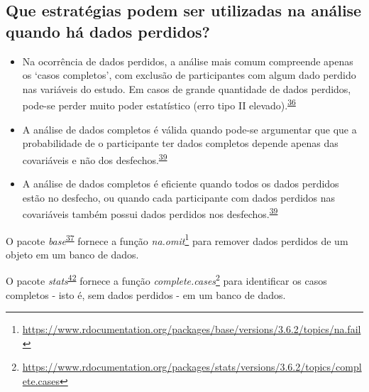 \documentclass[
  a4paper,
]{book}
\renewcommand{\href}[2]{#2\footnote{\url{#1}}}
\newenvironment{infobox}[1]
  {
  \begin{itemize}
  \renewcommand{\labelitemi}{
    \raisebox{-.7\height}[0pt][0pt]{
      {\setkeys{Gin}{width=3em,keepaspectratio}
        \texttt{[image: \#1]}}
    }
  }
  \setlength{\fboxsep}{1em}
  \begin{blackbox}
  \item
  }
  {
  \end{blackbox}
  \end{itemize}
  }
\begin{document}
\hypertarget{que-estratuxe9gias-podem-ser-utilizadas-na-anuxe1lise-quando-huxe1-dados-perdidos}{%
\subsection{Que estratégias podem ser utilizadas na análise quando há dados perdidos?}\label{que-estratuxe9gias-podem-ser-utilizadas-na-anuxe1lise-quando-huxe1-dados-perdidos}}

\begin{itemize}
\item
  Na ocorrência de dados perdidos, a análise mais comum compreende apenas os `casos completos', com exclusão de participantes com algum dado perdido nas variáveis do estudo. Em casos de grande quantidade de dados perdidos, pode-se perder muito poder estatístico (erro tipo II elevado).\textsuperscript{\protect\hyperlink{ref-Altman2007}{36}}
\item
  A análise de dados completos é válida quando pode-se argumentar que que a probabilidade de o participante ter dados completos depende apenas das covariáveis e não dos desfechos.\textsuperscript{\protect\hyperlink{ref-carpenter2021}{39}}
\item
  A análise de dados completos é eficiente quando todos os dados perdidos estão no desfecho, ou quando cada participante com dados perdidos nas covariáveis também possui dados perdidos nos desfechos.\textsuperscript{\protect\hyperlink{ref-carpenter2021}{39}}
\end{itemize}

\begin{infobox}{images/Rlogo}
O pacote \emph{base}\textsuperscript{\protect\hyperlink{ref-base-2}{37}} fornece a função \href{https://www.rdocumentation.org/packages/base/versions/3.6.2/topics/na.fail}{\emph{na.omit}} para remover dados perdidos de um objeto em um banco de dados.

\end{infobox}

\begin{infobox}{images/Rlogo}
O pacote \emph{stats}\textsuperscript{\protect\hyperlink{ref-stats}{42}} fornece a função \href{https://www.rdocumentation.org/packages/stats/versions/3.6.2/topics/complete.cases}{\emph{complete.cases}} para identificar os casos completos - isto é, sem dados perdidos - em um banco de dados.

\end{infobox}
\end{document}

